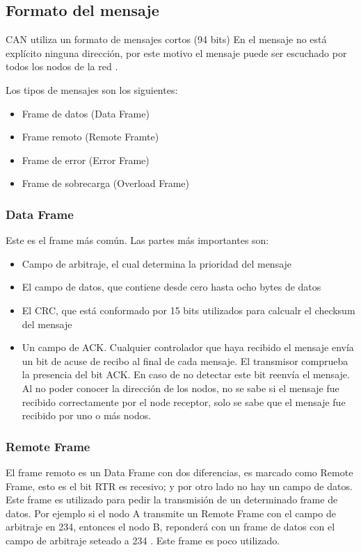 \subsection{Formato del mensaje}
CAN utiliza un formato de mensajes cortos (94 bits) En el mensaje no está explícito ninguna dirección, por este motivo el mensaje puede ser escuchado por todos los nodos de la red \citep{kvaserWEB}.

Los tipos de mensajes son los siguientes:
\begin{itemize}
    \item Frame de datos (Data Frame)
    \item Frame remoto (Remote Framte)
    \item Frame de error (Error Frame)
    \item Frame de sobrecarga (Overload Frame)
\end{itemize}

\subsubsection{Data Frame}
Este es el frame más común. Las partes más importantes son:

\begin{itemize}
\item Campo de arbitraje, el cual determina la prioridad del mensaje
\item El campo de datos, que contiene desde cero hasta ocho bytes de datos
\item El CRC, que está conformado por 15 bits utilizados para calcualr el checksum del mensaje
\item Un campo de ACK. Cualquier controlador que haya recibido el mensaje envía un bit de acuse de recibo al final de cada mensaje. El transmisor comprueba la presencia del bit ACK. En caso de no detectar este bit reenvía el mensaje. Al no poder conocer la dirección de los nodos, no se sabe si el mensaje fue recibido correctamente por el node receptor, solo se sabe que el mensaje fue recibido por uno o más nodos.
\end{itemize}

\subsubsection{Remote Frame}
El frame remoto es un Data Frame con dos diferencias, es marcado como Remote Frame, esto es el bit RTR es recesivo; y por otro lado no hay un campo de datos. Este frame es utilizado para pedir la transmisión de un determinado frame de datos. Por ejemplo si el nodo A transmite un Remote Frame con el campo de arbitraje en 234, entonces el nodo B, reponderá con un frame de datos con el campo de arbitraje seteado a 234 \citep{kvaserWEB}. Este frame es poco utilizado.

